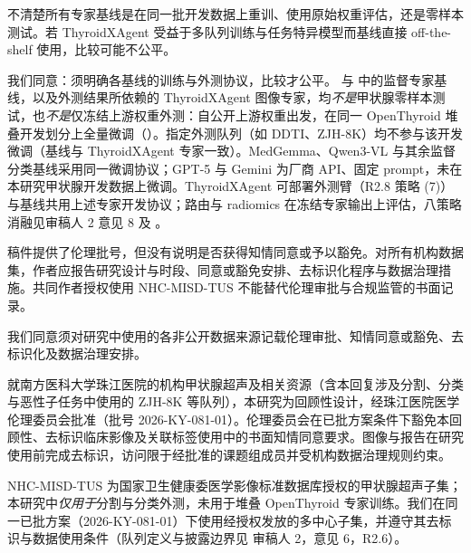 \begin{reviewercomment}
不清楚所有专家基线是在同一批开发数据上重训、使用原始权重评估，还是零样本测试。若 ThyroidXAgent 受益于多队列训练与任务特异模型而基线直接 off-the-shelf 使用，比较可能不公平。
\end{reviewercomment}
\begin{authorresponse}
我们同意：须明确各基线的训练与外测协议，比较才公平。 与  中的监督专家基线，以及外测结果所依赖的 ThyroidXAgent 图像专家，均\emph{不是}甲状腺零样本测试，也\emph{不是}仅冻结上游权重外测：自公开上游权重出发，在同一 OpenThyroid 堆叠开发划分上全量微调（）。指定外测队列（如 DDTI、ZJH-8K）均不参与该开发微调（基线与 ThyroidXAgent 专家一致）。MedGemma、Qwen3-VL 与其余监督分类基线采用同一微调协议；GPT-5 与 Gemini 为厂商 API、固定 prompt，未在本研究甲状腺开发数据上微调。ThyroidXAgent 可部署外测臂（R2.8 策略 (7)）与基线共用上述专家开发协议；路由与 radiomics 在冻结专家输出上评估，八策略消融见审稿人 2 意见 8 及 。\par
\par
\end{authorresponse}

\begin{reviewercomment}
稿件提供了伦理批号，但没有说明是否获得知情同意或予以豁免。对所有机构数据集，作者应报告研究设计与时段、同意或豁免安排、去标识化程序与数据治理措施。共同作者授权使用 NHC-MISD-TUS 不能替代伦理审批与合规监管的书面记录。
\end{reviewercomment}
\begin{authorresponse}
我们同意须对研究中使用的各非公开数据来源记载伦理审批、知情同意或豁免、去标识化及数据治理安排。\par
就南方医科大学珠江医院的机构甲状腺超声及相关资源（含本回复涉及分割、分类与恶性子任务中使用的 ZJH-8K 等队列），本研究为回顾性设计，经珠江医院医学伦理委员会批准（批号 2026-KY-081-01）。伦理委员会在已批方案条件下豁免本回顾性、去标识临床影像及关联标签使用中的书面知情同意要求。图像与报告在研究使用前完成去标识，访问限于经批准的课题组成员并受机构数据治理规则约束。\par
NHC-MISD-TUS 为国家卫生健康委医学影像标准数据库授权的甲状腺超声子集；本研究中\emph{仅用于}分割与分类外测，未用于堆叠 OpenThyroid 专家训练。我们在同一已批方案（2026-KY-081-01）下使用经授权发放的多中心子集，并遵守其去标识与数据使用条件（队列定义与披露边界见 审稿人 2，意见 6，R2.6）。\par
\end{authorresponse}

